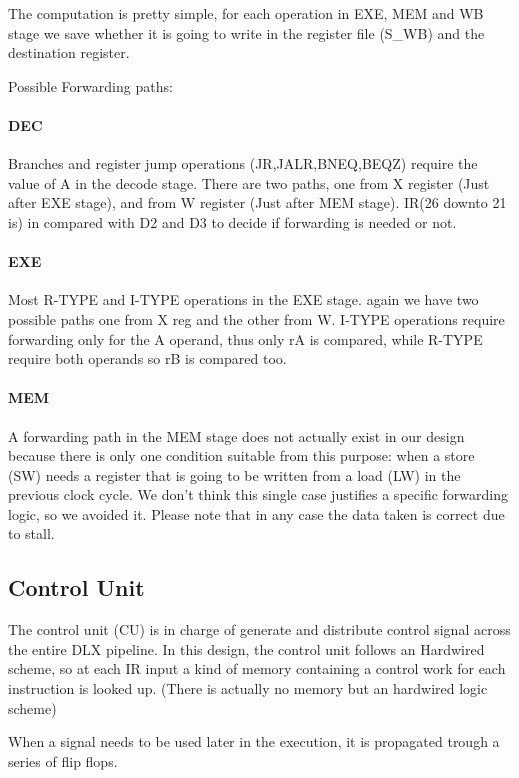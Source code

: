 \documentclass[12pt]{article}
\begin{document}
The computation is pretty simple, for each operation in EXE, MEM and WB stage we save whether it is going to write in the register file (S\_WB) and the destination register.

Possible Forwarding paths:
\paragraph{DEC} Branches and register jump operations (JR,JALR,BNEQ,BEQZ) require the value of A in the decode stage. There are two paths, one from X register (Just after EXE stage), and from W register (Just after MEM stage). IR(26 downto 21 is) in compared with D2 and D3 to decide if forwarding is needed or not.
\paragraph{EXE} Most R-TYPE and I-TYPE operations in the EXE stage. again we have two possible paths one from X reg and the other from W. I-TYPE operations require forwarding only for the A operand, thus only rA is compared, while R-TYPE require both operands so rB is compared too.
\paragraph{MEM} A forwarding path in the MEM stage does not actually exist in our design because there is only one condition suitable from this purpose: when a store (SW) needs a register that is going to be written from a load (LW) in the previous clock cycle.
We don't think this single case justifies a specific forwarding logic, so we avoided it. Please note that in any case the data taken is correct due to stall.

\subsection{Control Unit}
The control unit (CU) is in charge of generate and distribute control signal across the entire DLX pipeline.
In this design, the control unit follows an Hardwired scheme, so at each IR input a kind of memory containing a control work for each instruction is looked up. (There is actually no memory but an hardwired logic scheme)

When a signal needs to be used later in the execution, it is propagated trough a series of flip flops.
\end{document}
